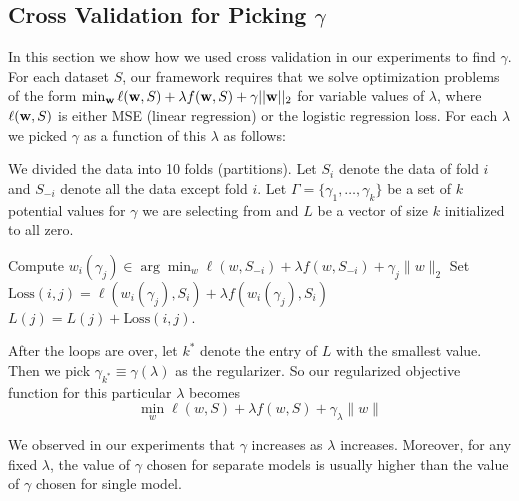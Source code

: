 \subsection{Cross Validation for Picking $\gamma$}
\label{sec:cross}

In this section we show how we used cross validation in our experiments to find $\gamma$.
For each dataset $S$, our framework requires that we 
solve optimization problems of the
form $\min_{\mathbf{w}} \ell(\mathbf{w},S) + \lambda f(\mathbf{w}, S) + \gamma ||\mathbf{w}||_2$ for
variable values of $\lambda$,
where $\ell(\mathbf{w},S)$ is either MSE (linear regression)
or the logistic regression loss.
For each $\lambda$ we picked $\gamma$ as
a function of this $\lambda$ as follows:

We divided the data into 10 folds (partitions).
Let $S_i$ denote the data of fold $i$ and
$S_{-i}$ denote all the data except fold $i$. 
Let $\Gamma=\{\gamma_1, \ldots, \gamma_k\}$ be a set of $k$ potential values for $\gamma$
we are selecting from and 
$L$ be a vector of size $k$ initialized to all zero.

\begin{algorithm}[h]
 \begin{algorithmic}
\State {}
\State {}
\State Compute $w_i(\gamma_j) \in \arg\min_{w} \ell(w, S_{-i}) + \lambda f(w, S_{-i}) + \gamma_j\|w\|_2$
\State {}
\State Set $\text{Loss}(i,j) = \ell(w_i(\gamma_j), S_{i}) + \lambda f(w_i(\gamma_j), S_{i})$
\State {} 
\State $L(j) = L(j) + \text{Loss}(i,j)$.
\State {}
\EndFor
\EndFor
\end{algorithmic}
\caption{Procedure for Picking $\gamma$}
\label{alg:lambda}
\end{algorithm}

 After the loops are over, let $k^*$ denote the entry of $L$ with the smallest value. Then we pick $\gamma_{k^*}\equiv \gamma(\lambda)$ as the regularizer.
So our regularized objective function for this particular $\lambda$ becomes 
\[
\min_w \ell(w,S) + \lambda f(w,S) + \gamma_{\lambda} \|w\|
\]

We observed in our experiments that $\gamma$ increases as $\lambda$ increases. 
Moreover, for any fixed $\lambda$, the value of $\gamma$ chosen for separate models is usually higher than the value
of $\gamma$ chosen for single model.

